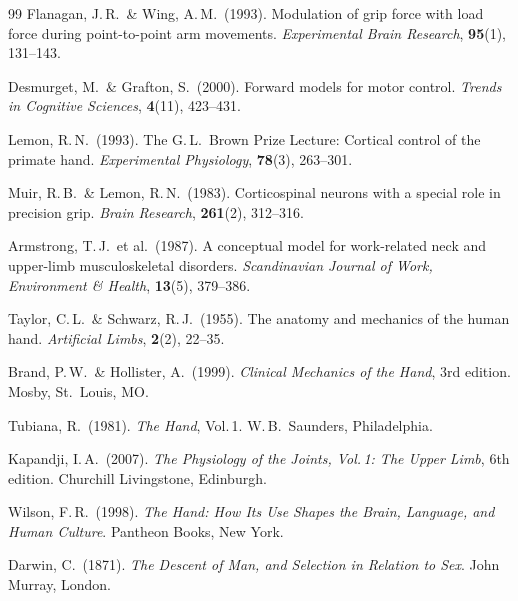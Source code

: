 ﻿\documentclass[12pt,a4paper]{report}
\theoremstyle{plain}
\theoremstyle{definition}
\theoremstyle{remark}
\begin{document}
\begin{thebibliography}{99}
Flanagan, J.\,R.\ \& Wing, A.\,M.\ (1993). Modulation of grip force with
load force during point-to-point arm movements. \emph{Experimental Brain
Research}, \textbf{95}(1), 131--143.

Desmurget, M.\ \& Grafton, S.\ (2000). Forward models for motor control.
\emph{Trends in Cognitive Sciences}, \textbf{4}(11), 423--431.

Lemon, R.\,N.\ (1993). The G.\,L.\ Brown Prize Lecture: Cortical control of
the primate hand. \emph{Experimental Physiology}, \textbf{78}(3), 263--301.

Muir, R.\,B.\ \& Lemon, R.\,N.\ (1983). Corticospinal neurons with a special
role in precision grip. \emph{Brain Research}, \textbf{261}(2), 312--316.

Armstrong, T.\,J.\ et al.\ (1987). A conceptual model for work-related neck
and upper-limb musculoskeletal disorders. \emph{Scandinavian Journal of Work,
Environment \& Health}, \textbf{13}(5), 379--386.

Taylor, C.\,L.\ \& Schwarz, R.\,J.\ (1955). The anatomy and mechanics of
the human hand. \emph{Artificial Limbs}, \textbf{2}(2), 22--35.

Brand, P.\,W.\ \& Hollister, A.\ (1999). \emph{Clinical Mechanics of the
Hand}, 3rd edition. Mosby, St.\ Louis, MO.

Tubiana, R.\ (1981). \emph{The Hand}, Vol.\,1. W.\,B.\ Saunders, Philadelphia.

Kapandji, I.\,A.\ (2007). \emph{The Physiology of the Joints, Vol.\,1: The
Upper Limb}, 6th edition. Churchill Livingstone, Edinburgh.

Wilson, F.\,R.\ (1998). \emph{The Hand: How Its Use Shapes the Brain,
Language, and Human Culture}. Pantheon Books, New York.

Darwin, C.\ (1871). \emph{The Descent of Man, and Selection in Relation to
Sex}. John Murray, London.

\end{thebibliography}
\end{document}
